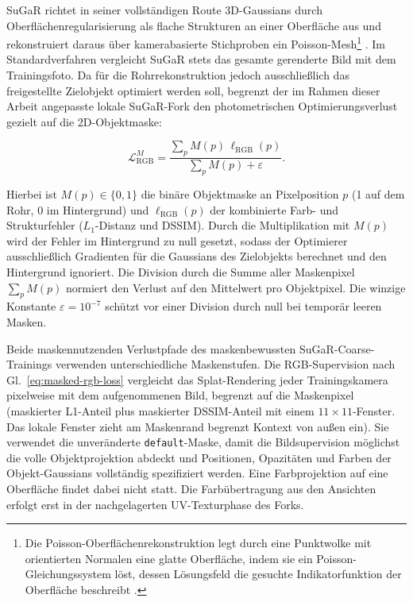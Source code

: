 SuGaR richtet in seiner vollständigen Route 3D-Gaussians durch
Oberflächenregularisierung als flache Strukturen an einer Oberfläche aus und
rekonstruiert daraus über kamerabasierte Stichproben ein
Poisson-Mesh\footnote{Die Poisson-Oberflächenrekonstruktion legt durch eine
Punktwolke mit orientierten Normalen eine glatte Oberfläche, indem sie ein
Poisson-Gleichungssystem löst, dessen Lösungsfeld die gesuchte
Indikatorfunktion der Oberfläche beschreibt \parencite{kazhdan2006poisson}.}
\parencite{guedon2024sugar}. Im Standardverfahren vergleicht SuGaR stets das
gesamte gerenderte Bild mit dem Trainingsfoto. Da für die Rohrrekonstruktion
jedoch ausschließlich das freigestellte Zielobjekt optimiert werden soll,
begrenzt der im Rahmen dieser Arbeit angepasste lokale SuGaR-Fork den
photometrischen Optimierungsverlust gezielt auf die 2D-Objektmaske:

\begin{equation}
	\mathcal{L}_{\mathrm{RGB}}^{M} =
	\frac{\sum_p M(p)\,\ell_{\mathrm{RGB}}(p)}
	{\sum_p M(p) + \varepsilon}.
	\label{eq:masked-rgb-loss}
\end{equation}

Hierbei ist $M(p) \in \{0, 1\}$ die binäre Objektmaske an Pixelposition $p$
(1 auf dem Rohr, 0 im Hintergrund) und $\ell_{\mathrm{RGB}}(p)$ der kombinierte
Farb- und Strukturfehler ($L_1$-Distanz und DSSIM). Durch die Multiplikation
mit $M(p)$ wird der Fehler im Hintergrund zu null gesetzt, sodass der
Optimierer ausschließlich Gradienten für die Gaussians des Zielobjekts
berechnet und den Hintergrund ignoriert. Die Division durch die Summe aller
Maskenpixel $\sum_p M(p)$ normiert den Verlust auf den Mittelwert pro
Objektpixel. Die winzige Konstante $\varepsilon = 10^{-7}$ schützt vor einer
Division durch null bei temporär leeren Masken.

Beide maskennutzenden Verlustpfade des maskenbewussten SuGaR-Coarse-Trainings
verwenden unterschiedliche Maskenstufen. Die RGB-Supervision nach
Gl.~\ref{eq:masked-rgb-loss} vergleicht das Splat-Rendering jeder
Trainingskamera pixelweise mit dem aufgenommenen Bild, begrenzt auf die
Maskenpixel (maskierter L1-Anteil plus maskierter DSSIM-Anteil mit einem
$11\times11$-Fenster. Das lokale Fenster zieht am Maskenrand begrenzt Kontext
von außen ein). Sie verwendet die unveränderte \texttt{default}-Maske, damit
die Bildsupervision möglichst die volle Objektprojektion abdeckt und
Positionen, Opazitäten und Farben der Objekt-Gaussians vollständig
spezifiziert werden. Eine Farbprojektion auf eine Oberfläche findet dabei
nicht statt. Die Farbübertragung aus den Ansichten erfolgt erst in der
nachgelagerten UV-Texturphase des Forks.

